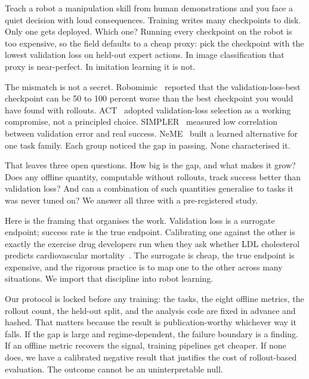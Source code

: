 Teach a robot a manipulation skill from human demonstrations and you face a quiet
decision with loud consequences. Training writes many checkpoints to disk. Only one gets
deployed. Which one? Running every checkpoint on the robot is too expensive, so the field
defaults to a cheap proxy: pick the checkpoint with the lowest validation loss on held-out
expert actions. In image classification that proxy is near-perfect. In imitation learning
it is not.

The mismatch is not a secret. Robomimic~\citep{mandlekar2021} reported that the
validation-loss-best checkpoint can be 50 to 100 percent worse than the best checkpoint you
would have found with rollouts. ACT~\citep{zhao2023act} adopted validation-loss selection as a
working compromise, not a principled choice. SIMPLER~\citep{li2024simpler} measured low correlation
between validation error and real success. NeME~\citep{tiezzi2025neme} built a learned
alternative for one task family. Each group noticed the gap in passing. None characterised it.

That leaves three open questions. How big is the gap, and what makes it grow? Does any
offline quantity, computable without rollouts, track success better than validation loss?
And can a combination of such quantities generalise to tasks it was never tuned on? We
answer all three with a pre-registered study.

Here is the framing that organises the work. Validation loss is a surrogate endpoint;
success rate is the true endpoint. Calibrating one against the other is exactly the exercise
drug developers run when they ask whether LDL cholesterol predicts cardiovascular
mortality~\citep{prentice1989}. The surrogate is cheap, the true endpoint is expensive, and
the rigorous practice is to map one to the other across many situations. We import that
discipline into robot learning.

Our protocol is locked before any training: the tasks, the eight offline metrics, the
rollout count, the held-out split, and the analysis code are fixed in advance and hashed.
That matters because the result is publication-worthy whichever way it falls. If the gap is
large and regime-dependent, the failure boundary is a finding. If an offline metric recovers
the signal, training pipelines get cheaper. If none does, we have a calibrated negative
result that justifies the cost of rollout-based evaluation. The outcome cannot be an
uninterpretable null.
